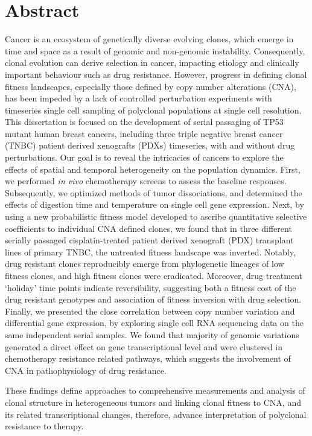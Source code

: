 
\chapter{Abstract}
Cancer is an ecosystem of genetically diverse evolving clones, which emerge in time and space as a result of genomic and non-genomic instability. Consequently, clonal evolution can derive selection in cancer, impacting etiology and clinically important behaviour such as drug resistance. However, progress in defining clonal fitness landscapes, especially those defined by copy number alterations (CNA), has been impeded by a lack of controlled perturbation experiments with timeseries single cell sampling of polyclonal populations at single cell resolution. This dissertation is focused on the development of serial passaging of TP53 mutant human breast cancers, including three triple negative breast cancer (TNBC) patient derived xenografts (PDXs) timeseries, with and without drug perturbations. Our goal is to reveal the intricacies of cancers to explore the effects of spatial and temporal heterogeneity on the population dynamics.
First, we performed \textit{in vivo} chemotherapy screens to assess the baseline responses. Subsequently, we optimized methods of tumor dissociations, and determined the effects of digestion time and temperature on single cell gene expression. Next, by using a new probabilistic fitness model developed to ascribe quantitative selective coefficients to individual CNA defined clones, we found that in three different serially passaged cisplatin-treated patient derived xenograft (PDX) transplant lines of primary TNBC, the untreated fitness landscape was inverted. Notably, drug resistant clones reproducibly emerge from phylogenetic lineages of low fitness clones, and high fitness clones were eradicated. Moreover, drug treatment `holiday' time points indicate reversibility, suggesting both a fitness cost of the drug resistant genotypes and association of fitness inversion with drug selection. Finally, we presented the close correlation between copy number variation and differential gene expression, by exploring single cell RNA sequencing data on the same independent serial samples. We found that majority of genomic variations generated a direct effect on gene transcriptional level and were clustered in chemotherapy resistance related pathways, which suggests the involvement of CNA in pathophysiology of drug resistance.

These findings define approaches to comprehensive measurements and analysis of clonal structure in heterogeneous tumors and linking clonal fitness to CNA, and its related transcriptional changes, therefore, advance interpretation of polyclonal resistance to therapy.





